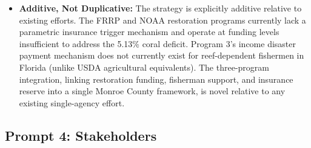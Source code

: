 \documentclass[10pt,letterpaper]{article}
\newcounter{metric}
\begin{document}
\begin{itemize}
    \item \textbf{Additive, Not Duplicative:} The strategy is explicitly additive relative to existing efforts. The FRRP and NOAA restoration programs currently lack a parametric insurance trigger mechanism and operate at funding levels insufficient to address the 5.13\% coral deficit. Program 3's income disaster payment mechanism does not currently exist for reef-dependent fishermen in Florida (unlike USDA agricultural equivalents). The three-program integration, linking restoration funding, fisherman support, and insurance reserve into a single Monroe County framework, is novel relative to any existing single-agency effort.

\end{itemize}

\subsection*{Prompt 4: Stakeholders}
\end{document}

